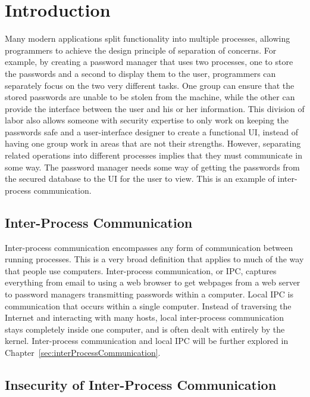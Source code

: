 \chapter{Introduction}
\label{sec:intro}

Many modern applications split functionality into multiple processes, allowing programmers to achieve the design principle of separation of concerns.  For example, by creating a password manager that uses two processes, one to store the passwords and a second to display them to the user, programmers can separately focus on the two very different tasks.  One group can ensure that the stored passwords are unable to be stolen from the machine, while the other can provide the interface between the user and his or her information.  This division of labor also allows someone with security expertise to only work on keeping the passwords safe and a user-interface designer to create a functional UI, instead of having one group work in areas that are not their strengths.  However, separating related operations into different processes implies that they must communicate in some way.  The password manager needs some way of getting the passwords from the secured database to the UI for the user to view.  This is an example of inter-process communication.

\section{Inter-Process Communication}
\label{sec:ipcIntro}
Inter-process communication encompasses any form of communication between running processes.  This is a very broad definition that applies to much of the way that people use computers.  Inter-process communication, or IPC, captures everything from email to using a web browser to get webpages from a web server to password managers transmitting passwords within a computer.  Local IPC is communication that occurs within a single computer.  Instead of traversing the Internet and interacting with many hosts, local inter-process communication stays completely inside one computer, and is often dealt with entirely by the kernel.  Inter-process communication and local IPC will be further explored in Chapter~\ref{sec:interProcessCommunication}.

\section{Insecurity of Inter-Process Communication}
\label{sec:ipcInsecurity}
